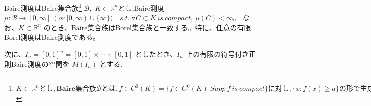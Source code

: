 \documentclass[a4paper]{jsarticle}%
\begin{document}
\begin{dfn}[Baire測度]
Baire測度はBaire集合族\footnote{$ K\subset \mathbb{R}^{n}とし,\mathbf{Baire}集合族 \mathcal{B}とは, f\in C^{0}(K)=\{f\in C^{0}(K)|Supp\ f\ is\ compact\}に対し,\{x;f(x)\geq a\}の形で生成される \mathcal{\sigma-代数}として定義される。
そのSuppを関数の台と言い、位相空間でK\subset \mathbb{R}^{n}とし、f:\ K\rightarrow \mathbb{R}(or\ \mathbb{C})について、関数の台とは、Supp\ f\coloneqq \overline{\{x\in K|f(x)\not = 0\}}\ (ただし上付きバーは閉包(Closure)を表す) $} $ \mathcal{B} $,\ 
$K\subset \mathbb{R}^{n}$とし,Baire測度 $ \mu : \mathcal{B}\rightarrow [0,\infty]\ (or\ [0,\infty)\cup\{\infty\})\quad s.t.\ \forall C\subset K\ is\ compact,\ \mu (C)<\infty 。$
なお、$K\subset \mathbb{R}^{n}$ のとき、Baire集合族はBorel集合族と一致する。特に、任意の有限Borel測度はBaire測度である。
\end{dfn}
次に、$I_n = [0, 1]^n = [0, 1] \times \cdots \times [0, 1]$ としたとき、$I_n$ 上の有限の符号付き正則Baire測度の空間を $M(I_n)$ とする.
\end{document}
